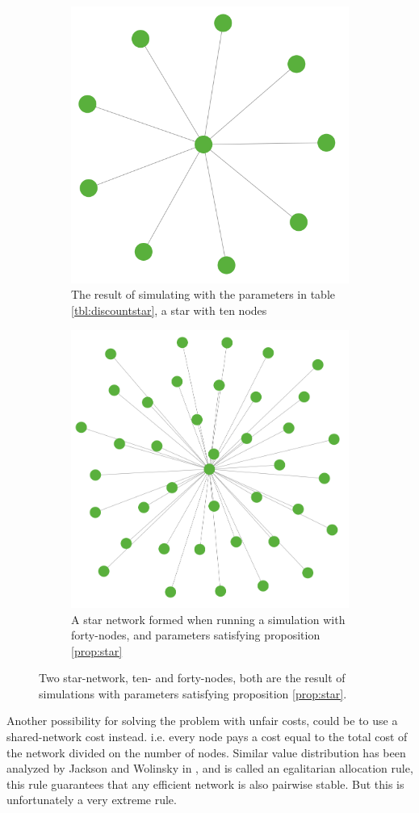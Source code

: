 \begin{figure}[h]
\centering
\begin{subfigure}{.9\textwidth}
  \centering
 \includegraphics[width=0.4\linewidth]{../Figures/discount/startennodes.png}
  \caption{\label{fig:star:a} The result of simulating with the parameters in table \ref{tbl:discountstar}, a star with ten nodes}
\end{subfigure}
\quad
  
\begin{subfigure}{.9\textwidth}
  \centering
  \includegraphics[width=0.4\linewidth]{../Figures/discount/starmanynodes.png}
  \caption{\label{fig:star:b} A star network formed when running a simulation with forty-nodes, and parameters satisfying proposition \ref{prop:star}}
\end{subfigure}
\caption{\label{fig:star1} Two star-network, ten- and forty-nodes, both are the result of simulations with parameters satisfying proposition \ref{prop:star}.}
\end{figure}


Another possibility for solving the problem with unfair costs, could be to use a shared-network cost instead. i.e. every node pays a cost equal to the total cost of the network divided on the number of nodes. 
Similar value distribution has been analyzed by Jackson and Wolinsky in \cite{jackson1996strategic}, and is called an egalitarian allocation rule, this rule guarantees that any efficient network is also pairwise stable. But this is unfortunately a very extreme rule.




